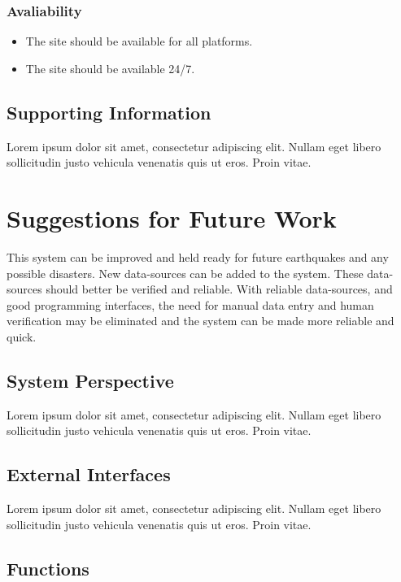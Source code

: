 \documentclass[a4paper]{article}
\begin{document}
            \subsubsection{Avaliability}
            \begin{itemize}
                \item The site should be available for all platforms.
                \item The site should be available 24/7.
            \end{itemize}
        \subsection{Supporting Information}

        Lorem ipsum dolor sit amet, consectetur adipiscing elit. Nullam eget libero sollicitudin justo vehicula venenatis quis ut eros. Proin vitae.

    \section{Suggestions for Future Work}

    This system can be improved and held ready for future earthquakes and any possible disasters.
    New data-sources can be added to the system. These data-sources should better be verified and reliable. With reliable data-sources, and good programming interfaces, the need for manual data entry and human verification may be eliminated and
    the system can be made more reliable and quick.
    
        \subsection{System Perspective}
    
        Lorem ipsum dolor sit amet, consectetur adipiscing elit. Nullam eget libero sollicitudin justo vehicula venenatis quis ut eros. Proin vitae.

        \subsection{External Interfaces}

        Lorem ipsum dolor sit amet, consectetur adipiscing elit. Nullam eget libero sollicitudin justo vehicula venenatis quis ut eros. Proin vitae.

        \subsection{Functions}
\end{document}

